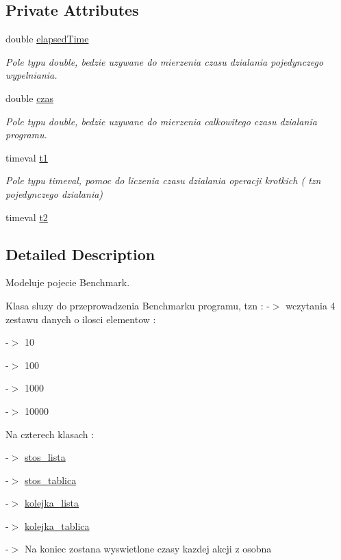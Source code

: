 \subsection*{Private Attributes}
\begin{DoxyCompactItemize}
\item 
double \hyperlink{classbenchmark_a90e6eda0144befd3f3bc1a881904fb57}{elapsed\-Time}
\begin{DoxyCompactList}\small\item\em Pole typu double, bedzie uzywane do mierzenia czasu dzialania pojedynczego wypelniania. \end{DoxyCompactList}\item 
double \hyperlink{classbenchmark_a563b747421276232836b7711b6881ec8}{czas}
\begin{DoxyCompactList}\small\item\em Pole typu double, bedzie uzywane do mierzenia calkowitego czasu dzialania programu. \end{DoxyCompactList}\item 
timeval \hyperlink{classbenchmark_a7789217b36df3b3ae427ceaaa2694d0b}{t1}
\begin{DoxyCompactList}\small\item\em Pole typu timeval, pomoc do liczenia czasu dzialania operacji krotkich ( tzn pojedynczego dzialania) \end{DoxyCompactList}\item 
timeval \hyperlink{classbenchmark_aea9f22e585c0c5826329e48a97a99803}{t2}
\end{DoxyCompactItemize}


\subsection{Detailed Description}
Modeluje pojecie Benchmark. 

Klasa sluzy do przeprowadzenia Benchmarku programu, tzn \-: -\/$>$ wczytania 4 zestawu danych o ilosci elementow \-: \par
-\/$>$ 10 \par
-\/$>$ 100 \par
-\/$>$ 1000 \par
-\/$>$ 10000 \par
 Na czterech klasach \-: \par
 -\/$>$ \hyperlink{classstos__lista}{stos\-\_\-lista} \par
 -\/$>$ \hyperlink{classstos__tablica}{stos\-\_\-tablica} \par
 -\/$>$ \hyperlink{classkolejka__lista}{kolejka\-\_\-lista} \par
 -\/$>$ \hyperlink{classkolejka__tablica}{kolejka\-\_\-tablica} \par
-\/$>$ Na koniec zostana wyswietlone czasy kazdej akcji z osobna 


